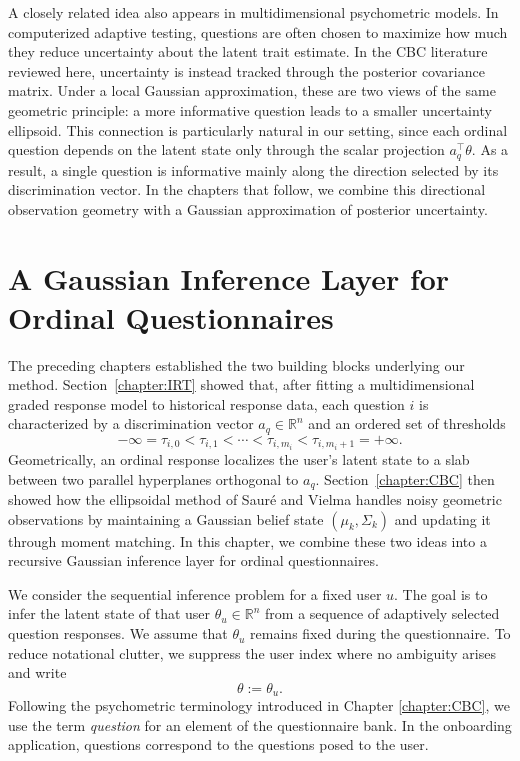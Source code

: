 \documentclass{article}
\begin{document}
A closely related idea also appears in multidimensional psychometric models. In
computerized adaptive testing, questions are often chosen to maximize how much they
reduce uncertainty about the latent trait estimate. In the CBC literature reviewed
here, uncertainty is instead tracked through the posterior covariance matrix. Under
a local Gaussian approximation, these are two views of the same geometric
principle: a more informative question leads to a smaller uncertainty ellipsoid.
This connection is particularly natural in our setting, since each ordinal question
depends on the latent state only through the scalar projection \(a_q^\top\theta\).
As a result, a single question is informative mainly along the direction selected
by its discrimination vector. In the chapters that follow, we combine this
directional observation geometry with a Gaussian approximation of posterior
uncertainty.


\newpage
\chapter[A Gaussian Inference Layer for Ordinal Questionnaires]{A Gaussian Inference Layer for Ordinal Questionnaires}\label{chapter:approach}

The preceding chapters established the two building blocks underlying our method.
Section~\ref{chapter:IRT} showed that, after fitting a multidimensional graded response model
to historical response data, each question $i$ is characterized by a discrimination vector
$a_q\in\mathbb R^n$ and an ordered set of thresholds
\begin{equation*}
   -\infty=\tau_{i,0}<\tau_{i,1}<\cdots<\tau_{i,m_i}<\tau_{i,m_i+1}=+\infty. 
\end{equation*}
Geometrically, an ordinal response localizes the user’s latent state to a slab between two
parallel hyperplanes orthogonal to $a_q$. Section~\ref{chapter:CBC} then showed how the
ellipsoidal method of Saur\'e and Vielma handles noisy geometric observations by maintaining
a Gaussian belief state $(\mu_k,\Sigma_k)$ and updating it through moment matching. In this
chapter, we combine these two ideas into a recursive Gaussian inference layer for ordinal
questionnaires.

We consider the sequential inference problem for a fixed user $u$. The goal is to infer the
 latent state of that user $\theta_u\in\mathbb R^n$ from a sequence of adaptively selected question
responses. We assume that $\theta_u$ remains fixed during the questionnaire. To reduce
notational clutter, we suppress the user index where no ambiguity arises and write 
\begin{equation*}
\theta := \theta_u .
\end{equation*}
Following the psychometric terminology introduced in Chapter \ref{chapter:CBC}, we use the term \emph{question} for an element of the
questionnaire bank. In the onboarding application, questions correspond to the questions posed
to the user.
\end{document}

